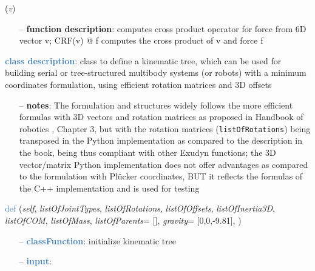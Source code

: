 \begin{itemize}[leftmargin=1.4cm]
\begin{itemize}[leftmargin=0.5cm]
\begin{itemize}[leftmargin=1.4cm]
\begin{itemize}[leftmargin=1.4cm]
\begin{itemize}[leftmargin=0.5cm]
\begin{itemize}[leftmargin=1.4cm]
\begin{itemize}[leftmargin=0.5cm]
\begin{itemize}[leftmargin=1.4cm]
\begin{itemize}[leftmargin=1.4cm]
\begin{itemize}[leftmargin=1.4cm]
\begin{flushleft}
\label{sec:kinematicTree:CRF}
({\it v})
\end{flushleft}
\setlength{\itemindent}{0.7cm}
\begin{itemize}[leftmargin=0.7cm]
  \item[--]  {\bf function description}: computes cross product operator for force from 6D vector v; CRF(v) @ f computes the cross product of v and force f\vspace{12pt}\end{itemize}
%
\noindent\textcolor{steelblue}{{\bf class description}}:  class to define a kinematic tree, which can be used for building serial or tree-structured multibody systems
         (or robots) with a minimum coordinates formulation, using efficient rotation matrices and 3D offsets
\setlength{\itemindent}{0.7cm}
\begin{itemize}[leftmargin=0.7cm]
  \item[--]  {\bf notes}: The formulation and structures widely follows the more efficient formulas with 3D vectors and rotation matrices as proposed in Handbook of robotics \cite{Siciliano2016}, Chapter 3, but with the rotation matrices (\texttt{listOfRotations}) being transposed in the Python implementation as compared to the description in the book, being thus compliant with other Exudyn functions; the 3D vector/matrix Python implementation does not offer advantages as compared to the formulation with Pl\"ucker coordinates, BUT it reflects the formulas of the C++ implementation and is used for testing\vspace{24pt}\end{itemize}
%
\begin{flushleft}
\noindent \textcolor{steelblue}{def {\bf {}}}\label{sec:kinematicTree:KinematicTree:__init__}
({\it self}, {\it listOfJointTypes}, {\it listOfRotations}, {\it listOfOffsets}, {\it listOfInertia3D}, {\it listOfCOM}, {\it listOfMass}, {\it listOfParents}= [], {\it gravity}= [0,0,-9.81], {\it })
\end{flushleft}
\setlength{\itemindent}{0.7cm}
\begin{itemize}[leftmargin=0.7cm]
  \item[--]  \textcolor{steelblue}{\bf classFunction}: initialize kinematic tree  \item[--]  \textcolor{steelblue}{\bf input}: \vspace{-6pt}

\end{itemize}
\end{itemize}
\end{itemize}
\end{itemize}
\end{itemize}
\end{itemize}
\end{itemize}
\end{itemize}
\end{itemize}
\end{itemize}
\end{itemize}
